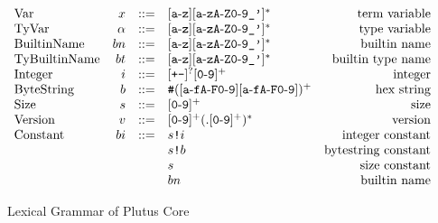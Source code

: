 \documentclass[../main.tex]{subfiles}
\begin{document}
\begin{figure*}[t]
    \centering
    \[\begin{array}{lrclr}
        \textrm{Var}     & x  & ::= & [\texttt{a}\!\hyphen{}\!\texttt{z}][\texttt{a}\!\hyphen{}\!\texttt{zA}\!\hyphen{}\!\texttt{Z0}\!\hyphen{}\!\texttt{9\_'}]^*                                                           & \textrm{term variable}\\
        \textrm{TyVar}   & \alpha & ::= & [\texttt{a}\!\hyphen{}\!\texttt{z}][\texttt{a}\!\hyphen{}\!\texttt{zA}\!\hyphen{}\!\texttt{Z0}\!\hyphen{}\!\texttt{9\_'}]^*                                                      & \textrm{type variable}\\
        \textrm{BuiltinName}    & bn  & ::= & [\texttt{a}\!\hyphen{}\!\texttt{z}][\texttt{a}\!\hyphen{}\!\texttt{zA}\!\hyphen{}\!\texttt{Z0}\!\hyphen{}\!\texttt{9\_'}]^*                                                          & \textrm{builtin name}\\
        \textrm{TyBuiltinName}    & bt  & ::= & [\texttt{a}\!\hyphen{}\!\texttt{z}][\texttt{a}\!\hyphen{}\!\texttt{zA}\!\hyphen{}\!\texttt{Z0}\!\hyphen{}\!\texttt{9\_'}]^* & \textrm{builtin type name}\\
        \textrm{Integer} & i  & ::= & [\texttt{+-}]^?[\texttt{0}\!\hyphen{}\!\texttt{9}]^+                                                                                                                                  & \textrm{integer}\\
        \textrm{ByteString}   & b  & ::= & \texttt{\#}([\texttt{a}\!\hyphen{}\!\texttt{fA}\!\hyphen{}\!\texttt{F0}\!\hyphen{}\!\texttt{9}][\texttt{a}\!\hyphen{}\!\texttt{fA}\!\hyphen{}\!\texttt{F0}\!\hyphen{}\!\texttt{9}])^+ & \textrm{hex string}\\
        \textrm{Size} & s  & ::= & [\texttt{0}\!\hyphen{}\!\texttt{9}]^+ & \textrm{size}\\
        \textrm{Version} & v & ::= & [\texttt{0}\!\hyphen{}\!\texttt{9}]^+(.[\texttt{0}\!\hyphen{}\!\texttt{9}]^+)^* & \textrm{version}\\
        \textrm{Constant} & bi & ::= & \sizedBuiltin{s}{i} & \textrm{integer constant}\\
                          &    &     & \sizedBuiltin{s}{b} & \textrm{bytestring constant}\\
                          &    &     & s & \textrm{size constant}\\
                          &    &     & bn & \textrm{builtin name}\\
        
    \end{array}\]
    \caption{Lexical Grammar of Plutus Core}
    \label{fig:Plutus_core_lexical_grammar}
\end{figure*}
\end{document}
